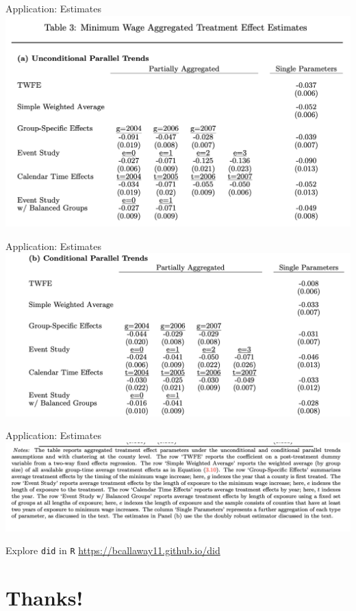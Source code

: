 \documentclass[xcolor=pdftex,dvipsnames,table,mathserif,aspectratio=169]{beamer}
\begin{document}
\begin{frame}{Application: Estimates}
\centering
\includegraphics[height=0.9\textheight]{resources/csa_tab3a.png}
\end{frame}

\begin{frame}{Application: Estimates}
\centering
\includegraphics[height=0.9\textheight]{resources/csa_tab3b.png}
\end{frame}

\begin{frame}{Application: Estimates}
\centering
\includegraphics[width=\textwidth]{resources/csa_notes.png}
\end{frame}

\begin{frame}{Explore \texttt{did} in \texttt{R}}
\href{https://bcallaway11.github.io/did/}{https://bcallaway11.github.io/did}
\end{frame}

\section*{Thanks!}
\end{document}
